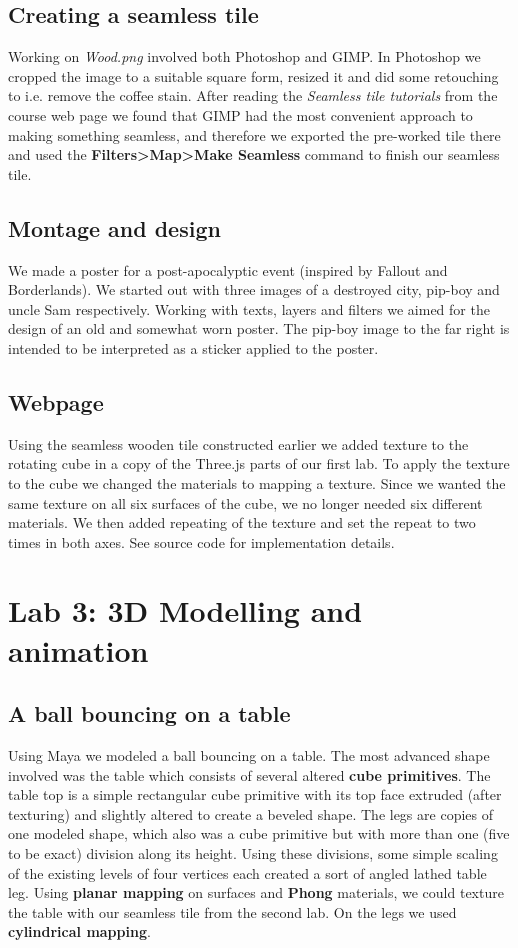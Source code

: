\documentclass[a4paper]{article}
\begin{document}
\subsection{Creating a seamless tile} %
Working on \textit{Wood.png} involved both Photoshop and GIMP. In Photoshop we
cropped the image to a suitable square form, resized it and did some retouching
to i.e. remove the coffee stain. After reading the \textit{Seamless tile
tutorials} from the course web page we found that GIMP had the most convenient
approach to making something seamless, and therefore we exported the pre-worked
tile there and used the \textbf{Filters>Map>Make Seamless} command to finish our
seamless tile.

\subsection{Montage and design} %
We made a poster for a post-apocalyptic event (inspired by Fallout and
Borderlands). We started out with three images of a destroyed city, pip-boy and
uncle Sam respectively. Working with texts, layers and filters we aimed for the
design of an old and somewhat worn poster. The pip-boy image to the far right is
intended to be interpreted as a sticker applied to the poster.

\subsection{Webpage} %
Using the seamless wooden tile constructed earlier we added texture to the
rotating cube in a copy of the Three.js parts of our first lab. To apply the
texture to the cube we changed the materials to mapping a texture. Since we
wanted the same texture on all six surfaces of the cube, we no longer needed six
different materials. We then added repeating of the texture and set the repeat
to two times in both axes. See source code for implementation details.

\section{Lab 3: 3D Modelling and animation}

\subsection{A ball bouncing on a table} %
Using Maya we modeled a ball bouncing on a table. The most advanced shape
involved was the table  which consists of several altered \textbf{cube
primitives}. The table top is a simple rectangular cube primitive with its top
face extruded (after texturing) and slightly altered to create a beveled shape.
The legs are copies of one modeled shape, which also was a cube primitive but
with more than one (five to be exact) division along its height. Using these
divisions, some simple scaling of the existing levels of four vertices each
created a sort of angled lathed table leg. Using \textbf{planar mapping} on
surfaces and \textbf{Phong} materials, we could texture the table with our
seamless tile from the second lab. On the legs we used \textbf{cylindrical
mapping}.
\end{document}
